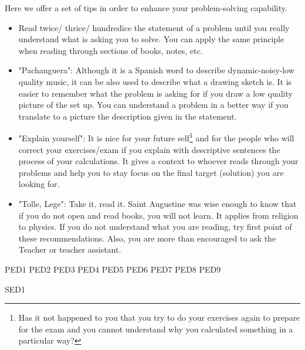 \documentclass[a4paper,12pt]{article}
\begin{document}
Here we offer a set of tips in order to enhance your problem-solving capability.

\begin{itemize}
	\item Read twice/ thrice/ hundredice the statement of a problem until you really understand what is asking you to solve. You can apply the same principle when reading through sections of books, notes, etc.
	
	\item "Pachanguera": Although it is a Spanish word to describe dynamic-noisy-low quality music, it can be also used to describe what a drawing sketch is. It is easier to remember what the problem is asking for if you draw a low quality picture of the set up. You can understand a problem in a better way if you translate to a picture the description given in the statement.
	
	\item "Explain yourself": It is nice for your future self\footnote{Has it not happened to you that you try to do your exercises again to prepare for the exam and you cannot understand why you calculated something in a particular way?} and for the people who will correct your exercises/exam if you explain with descriptive sentences the process of your calculations. It gives a context to whoever reads through your problems and help you to stay focus on the final target (solution) you are looking for.
	
	\item "Tolle, Lege": Take it, read it. Saint Augustine was wise enough to know that if you do not open and read books, you will not learn. It applies from religion to physics. If you do not understand what you are reading, try first point of these recommendations. Also, you are more than encouraged to ask the Teacher or teacher assistant.
\end{itemize}

\newpage


{PED1}
{PED2}
{PED3}
{PED4}
{PED5}
{PED6}
{PED7}
{PED8}
{PED9}


{SED1}
\end{document}
